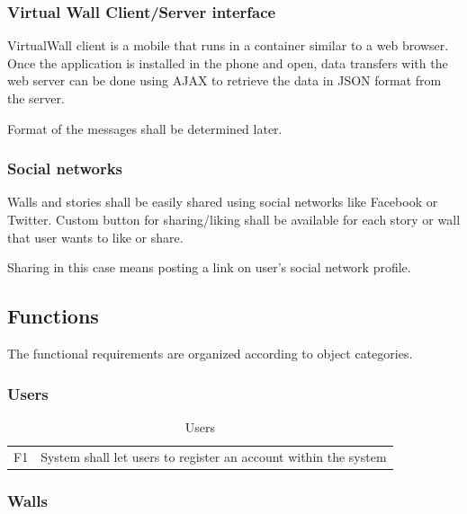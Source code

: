 \documentclass[11pt]{book}
\begin{document}
\subsubsection{Virtual Wall Client/Server interface}
VirtualWall client is a mobile that runs in a container similar to a web browser. Once the application is installed in the phone and open, data transfers with the web server can be done using AJAX to retrieve the data in JSON format from the server.

Format of the messages shall be determined later.

\subsubsection{Social networks}\label{sec:req_social_networks}
Walls and stories shall be easily shared using social networks like Facebook or Twitter. Custom button for sharing/liking shall be available for each story or wall that user wants to like or share.

Sharing in this case means posting a link on user's social network profile.

\subsection{Functions}
The functional requirements are organized according to object categories.

\subsubsection{Users}

\begin{table}[H]
\centering
\begin{tabular}{ l  p{11cm} }
F1 & System shall let users to register an account within the system\\
\end{tabular}
\label{tab:req_users}
\caption{Users}
\end{table}

\subsubsection{Walls}
\end{document}
